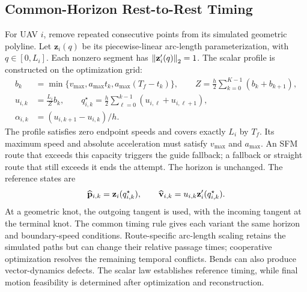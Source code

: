 \subsection{Common-Horizon Rest-to-Rest Timing}
For UAV $i$, remove repeated consecutive points from its simulated geometric polyline. Let $\mathbf z_i(q)$ be its piecewise-linear arc-length parameterization, with $q\in[0,L_i]$. Each nonzero segment has $\left\lVert \mathbf z_i'(q)\right\rVert_2=1$. The scalar profile is constructed on the optimization grid:
\begin{subequations}\label{eq:scalarprofile}\begin{align}
 b_k&=\min\{v_{\max},a_{\max}t_k,a_{\max}(T_f-t_k)\},\qquad
 Z=\frac h2\sum_{k=0}^{K-1}(b_k+b_{k+1}),\\
 u_{i,k}&=\frac{L_i}{Z}b_k,\qquad
 q_{i,k}^{\star}=\frac h2\sum_{\ell=0}^{k-1}(u_{i,\ell}+u_{i,\ell+1}),\\
 \alpha_{i,k}&=(u_{i,k+1}-u_{i,k})/h .
\end{align}\end{subequations}
The profile satisfies zero endpoint speeds and covers exactly $L_i$ by $T_f$. Its maximum speed and absolute acceleration must satisfy $v_{\max}$ and $a_{\max}$. An SFM route that exceeds this capacity triggers the guide fallback; a fallback or straight route that still exceeds it ends the attempt. The horizon is unchanged.
The reference states are
\begin{equation}
 \widehat{\mathbf{p}}_{i,k}=\mathbf z_i(q_{i,k}^{\star}),\qquad
 \widehat{\mathbf{v}}_{i,k}=u_{i,k}\mathbf z_i'(q_{i,k}^{\star}).
 \label{eq:reference}
\end{equation}
At a geometric knot, the outgoing tangent is used, with the incoming tangent at the terminal knot. The common timing rule gives each variant the same horizon and boundary-speed conditions. Route-specific arc-length scaling retains the simulated paths but can change their relative passage times; cooperative optimization resolves the remaining temporal conflicts. Bends can also produce vector-dynamics defects. The scalar law establishes reference timing, while final motion feasibility is determined after optimization and reconstruction.
